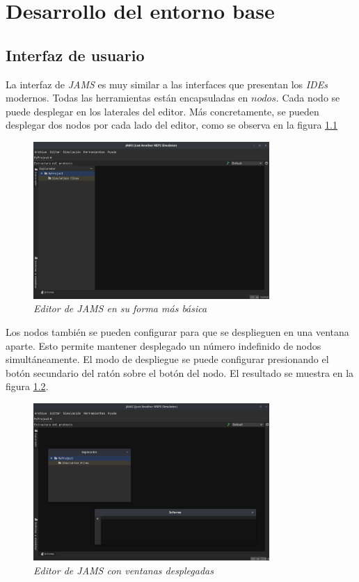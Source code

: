 \chapter{Desarrollo del entorno base}\label{ch:desarrollo-del-entorno-base}


\section{Interfaz de usuario}\label{sec:interfaz-de-usuario}

La interfaz de \textit{JAMS} es muy similar a las interfaces que presentan los \textit{IDEs} modernos.
Todas las herramientas están encapsuladas en $nodos$.
Cada nodo se puede desplegar en los laterales del editor.
Más concretamente, se pueden desplegar dos nodos por cada lado del editor,
como se observa en la figura \ref{fig:jams-basic}

\begin{figure}[H]
    \centering
    \includegraphics[width=0.8\textwidth]{images/base/jams-basic}
    \caption{\textit{Editor de \textit{JAMS} en su forma más básica}}
    \label{fig:jams-basic}
\end{figure}

Los nodos también se pueden configurar para que se desplieguen
en una ventana aparte.
Esto permite mantener desplegado un número indefinido de nodos simultáneamente.
El modo de despliegue se puede configurar presionando
el botón secundario del ratón sobre el botón del nodo.
El resultado se muestra en la figura \ref{fig:jams-windows}.

\begin{figure}[H]
    \centering
    \includegraphics[width=0.8\textwidth]{images/base/jams-windows}
    \caption{\textit{Editor de \textit{JAMS} con ventanas desplegadas}}
    \label{fig:jams-windows}
\end{figure}

